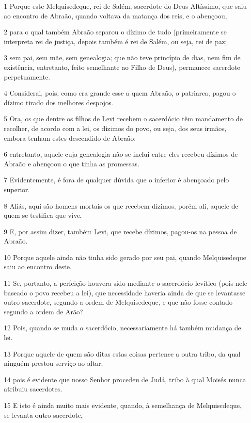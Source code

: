 \par 1 Porque este Melquisedeque, rei de Salém, sacerdote do Deus Altíssimo, que saiu ao encontro de Abraão, quando voltava da matança dos reis, e o abençoou,
\par 2 para o qual também Abraão separou o dízimo de tudo (primeiramente se interpreta rei de justiça, depois também é rei de Salém, ou seja, rei de paz;
\par 3 sem pai, sem mãe, sem genealogia; que não teve princípio de dias, nem fim de existência, entretanto, feito semelhante ao Filho de Deus), permanece sacerdote perpetuamente.
\par 4 Considerai, pois, como era grande esse a quem Abraão, o patriarca, pagou o dízimo tirado dos melhores despojos.
\par 5 Ora, os que dentre os filhos de Levi recebem o sacerdócio têm mandamento de recolher, de acordo com a lei, os dízimos do povo, ou seja, dos seus irmãos, embora tenham estes descendido de Abraão;
\par 6 entretanto, aquele cuja genealogia não se inclui entre eles recebeu dízimos de Abraão e abençoou o que tinha as promessas.
\par 7 Evidentemente, é fora de qualquer dúvida que o inferior é abençoado pelo superior.
\par 8 Aliás, aqui são homens mortais os que recebem dízimos, porém ali, aquele de quem se testifica que vive.
\par 9 E, por assim dizer, também Levi, que recebe dízimos, pagou-os na pessoa de Abraão.
\par 10 Porque aquele ainda não tinha sido gerado por seu pai, quando Melquisedeque saiu ao encontro deste.
\par 11 Se, portanto, a perfeição houvera sido mediante o sacerdócio levítico (pois nele baseado o povo recebeu a lei), que necessidade haveria ainda de que se levantasse outro sacerdote, segundo a ordem de Melquisedeque, e que não fosse contado segundo a ordem de Arão?
\par 12 Pois, quando se muda o sacerdócio, necessariamente há também mudança de lei.
\par 13 Porque aquele de quem são ditas estas coisas pertence a outra tribo, da qual ninguém prestou serviço ao altar;
\par 14 pois é evidente que nosso Senhor procedeu de Judá, tribo à qual Moisés nunca atribuiu sacerdotes.
\par 15 E isto é ainda muito mais evidente, quando, à semelhança de Melquisedeque, se levanta outro sacerdote,
